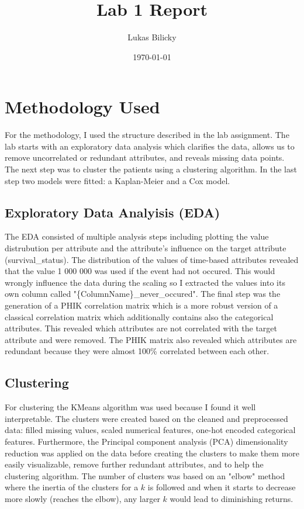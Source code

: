 \documentclass[a4paper,12pt]{article}
\title{Lab 1 Report}
\author{Lukas Bilicky}
\date{\today}
\begin{document}
\maketitle

\section{Methodology Used}
For the methodology, I used the structure described in the lab assignment. The lab starts with an exploratory data analysis which clarifies the data, allows us to remove uncorrelated or redundant attributes, and reveals missing data points. The next step was to cluster the patients using a clustering algorithm. In the last step two models were fitted: a Kaplan-Meier and a Cox model.

\subsection{Exploratory Data Analyisis (EDA)}

The EDA consisted of multiple analysis steps including plotting the value distrubution per attribute and the attribute's influence on the target attribute (survival\_status). The distribution of the values of time-based attributes revealed that the value 1 000 000 was used if the event had not occured. This would wrongly influence the data during the scaling so I extracted the values into its own column called "\{ColumnName\}\_never\_occured". The final step was the generation of a PHIK correlation matrix which is a more robust version of a classical correlation matrix which additionally contains also the categorical attributes. This revealed which attributes are not correlated with the target attribute and were removed. The PHIK matrix also revealed which attributes are redundant because they were almost 100\% correlated between each other.

\subsection{Clustering}

For clustering the KMeans algorithm was used because I found it well interpretable. The clusters were created based on the cleaned and preprocessed data: filled missing values, scaled numerical features, one-hot encoded categorical features. Furthermore, the Principal component analysis (PCA) dimensionality reduction was applied on the data before creating the clusters to make them more easily visualizable, remove further redundant attributes, and to help the clustering algorithm. The number of clusters was based on an "elbow" method where the inertia of the clusters for a $k$ is followed and when it starts to decrease more slowly (reaches the elbow), any larger $k$ would lead to diminishing returns.
\end{document}
